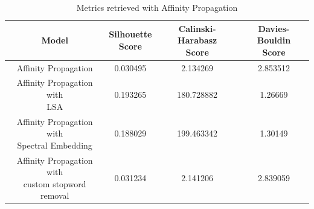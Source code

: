 \begin{table}[]
  \centering
  \begin{tabular}{c|c|c|c}
    Model &  \shortstack[c]{Silhouette \\ Score} & \shortstack[c]{Calinski-Harabasz \\ Score} &  \shortstack[c]{Davies-Bouldin \\ Score}  \\
    \hline
    \hline
    Affinity Propagation & 0.030495 & 2.134269 & 2.853512 \\
    \hline
    \shortstack[c]{Affinity Propagation with \\ LSA} & 0.193265 & 180.728882 & 1.26669 \\
    \hline
    \shortstack[c]{Affinity Propagation with \\ Spectral Embedding} & 0.188029 & 199.463342 & 1.30149 \\
    \hline
    \shortstack[c]{Affinity Propagation with \\ custom stopword removal} & 0.031234 & 2.141206 & 2.839059 \\
   \end{tabular}
  \caption{Metrics retrieved with Affinity Propagation}
  \label{tab:scores_affinity_propagation}
\end{table}


